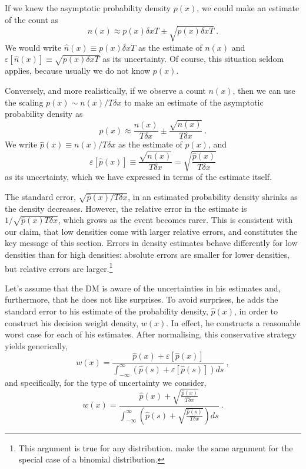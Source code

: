 \documentclass[a4paper, 12pt]{article}
\newcommand{\elabel}[1]{\label{eq:#1}}
\newcommand{\be}{\begin{equation}}
\newcommand{\ee}{\end{equation}}
\newcommand{\err}[1]{\varepsilon\left[#1\right]}
\newcommand{\phat}{\hat{p}}
\newcommand{\nhat}{\hat{n}}
\begin{document}
If we knew the asymptotic probability density $p(x)$, we could make an estimate of the count as
\be
n(x) \approx p(x) \delta x T \pm \sqrt{p(x) \delta x T} ~.
\elabel{count_est}
\ee
We would write $\nhat(x) \equiv p(x) \delta x T$ as the estimate of $n(x)$ and $\err{\nhat(x)} \equiv \sqrt{p(x) \delta x T}$ as its uncertainty. Of course, this situation seldom applies, because usually we do not know $p(x)$.

Conversely, and more realistically, if we observe a count $n(x)$, then we can use the scaling $ p(x) \sim n(x)/T\delta x$ to make an estimate of the asymptotic probability density as
\be
p(x) \approx \frac{n(x)}{T\delta x} \pm \frac{\sqrt{n(x)}}{T \delta x} ~.
\elabel{prob_est}
\ee
We write $\phat(x) \equiv n(x)/T\delta x$ as the estimate of $p(x)$, and
\be
\err{\phat(x)} \equiv \frac{\sqrt{n(x)}}{T \delta x} = \sqrt{\frac{\phat(x)}{T \delta x}}
\ee
as its uncertainty, which we have expressed in terms of the estimate itself.

The standard error, $ \sqrt{\phat(x)/T \delta x}$, in an estimated probability density shrinks as the density decreases. However, the relative error in the estimate is $1/\sqrt{\phat(x)T\delta x}$, which grows as the event becomes rarer. This is consistent with our claim, that low densities come with larger relative errors, and constitutes the key message of this section. Errors in density estimates behave differently for low densities than for high densities: absolute errors are smaller for lower densities, but relative errors are larger.\footnote{This argument is true for any distribution. \textcite[537-8]{HertwigETAL2004} make the same argument for the special case of a binomial distribution.}

Let's assume that the DM is aware of the uncertainties in his estimates and, furthermore, that he does not like surprises. To avoid surprises, he adds the standard error to his estimate of the probability density, $\phat(x)$, in order to construct his decision weight density, $w(x)$. In effect, he constructs a reasonable worst case for each of his estimates. After normalising, this conservative strategy yields generically,
\be
w(x) = \frac{\phat(x)+\err{\phat(x)}}{\int_{-\infty}^{\infty}\left(\phat(s)+\err{\phat(s)}\right)ds}~,
\elabel{weight_density_gen}
\ee
and specifically, for the type of uncertainty we consider,
\be
w(x)= \frac{\phat(x)+\sqrt{\frac{\phat(x)}{T \delta x}}}{\int_{-\infty}^{\infty}\left(\phat(s)+\sqrt{\frac{\phat(s)}{T \delta x}}\right)ds}~.
\elabel{weight_density_spec}
\ee
\end{document}
